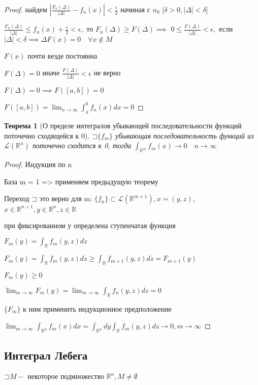 \documentclass[a4paper, 12pt]{article}
\newcommand\letsymbol{\mathord{\sqsupset}}
\newtheorem{theorem}{Теорема}[section]
\theoremstyle{definition}
\theoremstyle{remark}
\begin{document}
\begin{proof}
     найдем $|\frac{F_n(\Delta)}{|\Delta|} - f_n(x)|< \frac{\epsilon}{2}$ начиная с $n_0$ [$\delta >0, |\Delta|<\delta$]

     $\frac{F_n(\Delta)}{|\Delta|}\leq f_n(x) + \frac{\epsilon}{2}< \epsilon,$ то $F_n(\Delta)\geq F(\Delta)\implies$
     $0\leq \frac{F(\Delta)}{|\Delta|}<\epsilon,$ если $|\Delta|<\delta\implies\Delta F(x) = 0 \quad \forall x\notin M$
     
     $F(x)$ почти везде постоянна

     $F(\Delta) = 0$ иначе $\frac{F(\Delta)}{|\Delta|}<\epsilon$ не верно

     $F(\Delta) = 0\implies F([a, b]) = 0$

     $F([a,b]) = \lim_{n\to\infty}\int_a^b f_n(x)dx = 0$
\end{proof}
\begin{theorem}[О пределе интегралов убывающей последовательности функций поточечно сходящейся к 0]
     $\letsymbol{}\{f_m\}$ убывающая последовательность функций из $\mathcal{L} (\mathbb{R} ^n)$
     поточечно сходится к 0, тогда $\int_{\mathbb{R} ^m}f_m(x)\to0 \quad n\to\infty$
\end{theorem}
\begin{proof}
     Индукция по n
     
     База m = 1 => применяем предыдущую теорему

     Переход $\letsymbol{}$ это верно для m: $\{f_n\}\subset\mathcal{L} (\mathbb{R} ^{m+1}), x = (y, z),$
     $x\in \mathbb{R} ^{n+1}, y\in \mathbb{R} ^n, z\in\mathbb{R} $

     при фиксированном у определена ступенчатая функция

     $F_m(y) = \int_\mathbb{R} f_m(y, z)dz$

     $F_m(y) = \int_\mathbb{R} f_m(y, z)dz\geq\int_\mathbb{R} f_{m+1}(y, z)dz = F_{m+1}(y)$

     $F_m(y)\geq 0$

     $\lim_{m\to\infty}F_m(y) = \lim_{m\to \infty}\int_\mathbb{R} f_n(y, z)dz = 0$

     $\{F_m\}$ к ним применить индукционное предположение

     $\lim_{m\to\infty}\int_{\mathbb{R} ^n}f_m(x)dx = \int_{\mathbb{R} ^n}dy \int_\mathbb{R} f_m(y,z)dz\to 0, m\to\infty$
\end{proof}
\subsection{Интеграл Лебега}
$\letsymbol{} M -$ некоторое подмножество $\mathbb{R} ^n, M\neq\emptyset$
\end{document}
